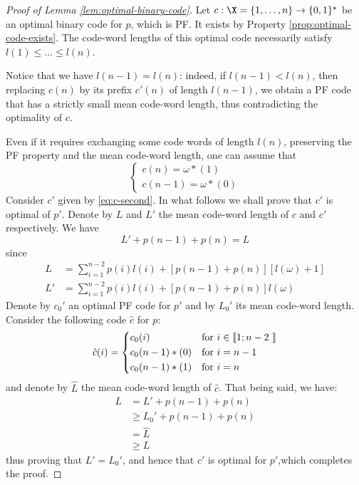 \documentclass[toc]{../cs-classes/cs-classes}
\begin{document}
\begin{proof}[Proof of Lemma \ref{lem:optimal-binary-code}]
    Let $c:\X=\{1, \dots, n\}\to\{0, 1\}^\star$ be an optimal binary code for $p$, which is PF. It exists by Property \ref{prop:optimal-code-exists}. The code-word lengths of this optimal code necessarily satisfy $l(1)\leq\dots\leq l(n)$.

    Notice that we have $l(n-1) = l(n)$: indeed, if $l(n-1)<l(n)$, then replacing $c(n)$ by its prefix $c'(n)$ of length $l(n-1)$, we obtain a PF code that has a strictly small mean code-word length, thus contradicting the optimality of $c$.

    Even if it requires exchanging some code words of length $l(n)$, preserving the PF property and the mean code-word length, one can assume that
    \begin{equation*}
        \begin{cases*}
            c(n) = \omega * (1)\\
            c(n-1) = \omega * (0)
        \end{cases*}
    \end{equation*}
    Consider $c'$ given by \eqref{eq:c-second}. In what follows we shall prove that $c'$ is optimal of $p'$. Denote by $L$ and $L'$ the mean code-word length of $c$ and $c'$ respectively. We have
    \begin{equation*}
        L' + p(n-1) + p(n) = L
    \end{equation*}
    since
    \begin{equation*}
        \begin{aligned}
            L &= \sum_{i=1}^{n-2} p(i)l(i) + [p(n-1)+p(n)][l(\omega)+1]\\
            L' &= \sum_{i=1}^{n-2} p(i)l(i) + [p(n-1)+p(n)] l(\omega)
        \end{aligned}
    \end{equation*}
    Denote by $c_0'$ an optimal PF code for $p'$ and by $L_0'$ its mean code-word length. Consider the following code $\hat{c}$ for $p$:
    \begin{equation*}
        \hat{c}(i) = \begin{cases*}
            c_0(i) & for $i\in\llbracket 1; n-2 \rrbracket$\\
            c_0(n-1) * (0) & for $i=n-1$\\
            c_0(n-1) * (1) & for $i=n$\\
        \end{cases*}
    \end{equation*}
    and denote by $\hat{L}$ the mean code-word length of $\hat{c}$. That being said, we have:
    \begin{equation*}
        \begin{aligned}
            L &= L' + p(n-1) + p(n)\\
            &\geq L_0' + p(n-1) + p(n)\\
            &= \hat{L}\\
            &\geq L
        \end{aligned}
    \end{equation*}
    thus proving that $L'=L_0'$, and hence that $c'$ is optimal for $p'$,which completes the proof.
\end{proof}
\end{document}
